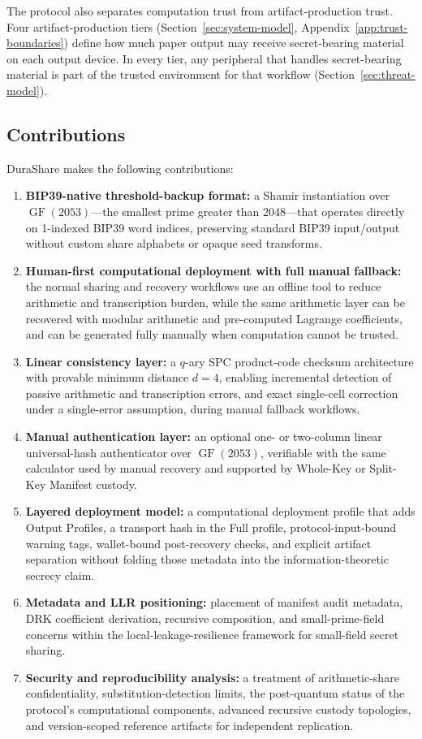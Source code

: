 \documentclass[11pt]{article}
\newcommand{\GF}{\operatorname{GF}}
\begin{document}
The protocol also separates computation trust from artifact-production trust. Four artifact-production tiers (Section~\ref{sec:system-model}, Appendix~\ref{app:trust-boundaries}) define how much paper output may receive secret-bearing material on each output device. In every tier, any peripheral that handles secret-bearing material is part of the trusted environment for that workflow (Section~\ref{sec:threat-model}).

\subsection{Contributions}

DuraShare makes the following contributions:

\begin{enumerate}[noitemsep]
    \item \textbf{BIP39-native threshold-backup format:} a Shamir instantiation over $\GF(2053)$---the smallest prime greater than 2048---that operates directly on 1-indexed BIP39 word indices, preserving standard BIP39 input/output without custom share alphabets or opaque seed transforms.
    \item \textbf{Human-first computational deployment with full manual fallback:} the normal sharing and recovery workflows use an offline tool to reduce arithmetic and transcription burden, while the same arithmetic layer can be recovered with modular arithmetic and pre-computed Lagrange coefficients, and can be generated fully manually when computation cannot be trusted.
    \item \textbf{Linear consistency layer:} a $q$-ary SPC product-code checksum architecture with provable minimum distance $d = 4$, enabling incremental detection of passive arithmetic and transcription errors, and exact single-cell correction under a single-error assumption, during manual fallback workflows.
    \item \textbf{Manual authentication layer:} an optional one- or two-column linear universal-hash authenticator over $\GF(2053)$, verifiable with the same calculator used by manual recovery and supported by Whole-Key or Split-Key Manifest custody.
    \item \textbf{Layered deployment model:} a computational deployment profile that adds Output Profiles, a transport hash in the Full profile, protocol-input-bound warning tags, wallet-bound post-recovery checks, and explicit artifact separation without folding those metadata into the information-theoretic secrecy claim.
    \item \textbf{Metadata and LLR positioning:} placement of manifest audit metadata, DRK coefficient derivation, recursive composition, and small-prime-field concerns within the local-leakage-resilience framework for small-field secret sharing.
    \item \textbf{Security and reproducibility analysis:} a treatment of arithmetic-share confidentiality, substitution-detection limits, the post-quantum status of the protocol's computational components, advanced recursive custody topologies, and version-scoped reference artifacts for independent replication.
\end{enumerate}
\end{document}
